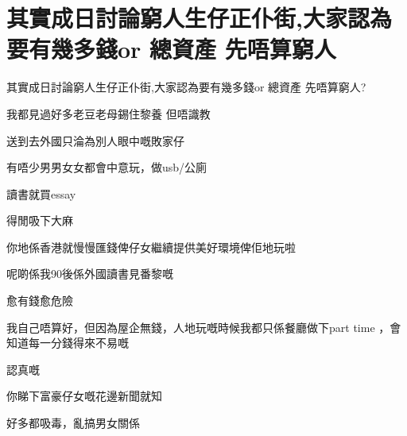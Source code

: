 \chapter{其實成日討論窮人生仔正仆街,大家認為要有幾多錢or 總資產 先唔算窮人}

其實成日討論窮人生仔正仆街,大家認為要有幾多錢or 總資產 先唔算窮人?

我都見過好多老豆老母錫住黎養 但唔識教

送到去外國只淪為別人眼中嘅敗家仔

有唔少男男女女都會中意玩，做usb/公廁

讀書就買essay

得閒吸下大麻

你地係香港就慢慢匯錢俾仔女繼續提供美好環境俾佢地玩啦

呢啲係我90後係外國讀書見番黎嘅

愈有錢愈危險

我自己唔算好，但因為屋企無錢，人地玩嘅時候我都只係餐廳做下part time ，會知道每一分錢得來不易嘅

認真嘅

你睇下富豪仔女嘅花邊新聞就知

好多都吸毒，亂搞男女關係

